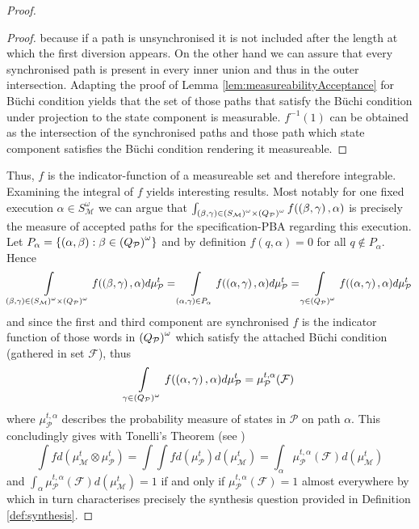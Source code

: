 \begin{proof}
\begin{proof}
  because if a path is unsynchronised it is not included after the length at
  which the first diversion appears. On the other hand we can assure that every
  synchronised path is present in every inner union and thus in the outer
  intersection. Adapting the proof of Lemma \ref{lem:measureabilityAcceptance}
  for Büchi condition yields that the set of those paths that satisfy the Büchi
  condition under projection to the state component is measurable. $f^{-1}(1)$
  can be obtained as the intersection of the synchronised paths and those
  path which state component satisfies the Büchi condition rendering it
  measureable.
\end{proof}
Thus, $f$ is the indicator-function of a measureable set and therefore
integrable. Examining the integral of $f$ yields interesting results. Most
notably for one fixed execution $\alpha\in S_{\mathcal{M}}^{\omega}$ we can
argue that $\int_{\left(\beta,\gamma\right)\in
\left(S_{\mathcal{M}}\right)^{\omega}\times\left(Q_{\mathcal{P}}\right)^{\omega}}
f(\left(\beta,\gamma\right),\alpha)$ is precisely the measure of accepted paths for
the specification-\ac{PBA} regarding this execution. Let
$P_{\alpha} = \left\{\left(\alpha, \beta\right):\beta\in
\left(Q_{\mathcal{P}}\right)^{\omega}\right\}$ and by definition $f(q, \alpha) = 0$ for all
$q\not\in P_{\alpha}$. Hence
\begin{equation*}
  \int\limits_{\left(\beta,\gamma\right)\in
  \left(S_{\mathcal{M}}\right)^{\omega}\times\left(Q_{\mathcal{P}}\right)^{\omega}}
  f(\left(\beta,\gamma\right),\alpha)d\mu_{\mathcal{P}}^{t}
  =\int\limits_{\left(\alpha,\gamma\right)\in P_{\alpha}}
  f(\left(\alpha,\gamma\right),\alpha)d\mu_{\mathcal{P}}^{t}
  =\int\limits_{\gamma\in\left(Q_{\mathcal{P}}\right)^{\omega}}
  f(\left(\alpha,\gamma\right),\alpha)d\mu_{\mathcal{P}}^{t}
\end{equation*}
and since the first and third component are synchronised $f$ is the indicator
function of those words in $\left(Q_{\mathcal{P}}\right)^{\omega}$ which satisfy the
attached Büchi condition (gathered in set $\mathcal{F}$), thus
\begin{equation*}
  \int\limits_{\gamma\in\left(Q_{\mathcal{P}}\right)^{\omega}}
  f(\left(\alpha,\gamma\right),\alpha)d\mu_{\mathcal{P}}^{t}
  = \mu_{\mathcal{P}}^{t,\alpha}(\mathcal{F})
\end{equation*}
where $\mu_{\mathcal{P}}^{t,\alpha}$ describes the probability measure of
states in $\mathcal{P}$ on path $\alpha$. This concludingly gives with
Tonelli's Theorem (see \cite[Theorem 23.6]{Bauer})
\begin{equation*}
  \int f d(\mu_{\mathcal{M}}^{t}\otimes\mu_{\mathcal{P}}^{t}) =
  \int\int f d(\mu_{\mathcal{P}}^{t})d(\mu_{\mathcal{M}}^{t}) =
  \int_{\alpha}\mu_{\mathcal{P}}^{t,\alpha}(\mathcal{F})d(\mu_{\mathcal{M}}^{t})
\end{equation*}
and $\int_{\alpha}\mu_{\mathcal{P}}^{t,\alpha}(\mathcal{F})
d(\mu_{\mathcal{M}}^{t}) = 1$ if and only if
$\mu_{\mathcal{P}}^{t,\alpha}(\mathcal{F}) = 1$ almost everywhere by
\cite[Lemma 40]{RandAutoInfTrees} which in turn characterises precisely the
synthesis question provided in Definition \ref{def:synthesis}.


\end{proof}
